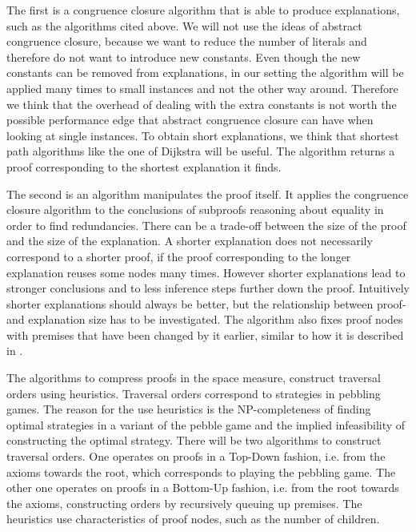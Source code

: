 The first is a congruence closure algorithm that is able to produce explanations, such as the algorithms cited above.
We will not use the ideas of abstract congruence closure, because we want to reduce the number of literals and therefore do not want to introduce new constants.
Even though the new constants can be removed from explanations, in our setting the algorithm will be applied many times to small instances and not the other way around. 
Therefore we think that the overhead of dealing with the extra constants is not worth the possible performance edge \cite{Bachmair2000} that abstract congruence closure can have when looking at single instances.
To obtain short explanations, we think that shortest path algorithms like the one of Dijkstra \cite{Dijkstra1959,Cormen1989} will be useful.
The algorithm returns a proof corresponding to the shortest explanation it finds.

The second is an algorithm manipulates the proof itself.
It applies the congruence closure algorithm to the conclusions of subproofs reasoning about equality in order to find redundancies.
There can be a trade-off between the size of the proof and the size of the explanation.
A shorter explanation does not necessarily correspond to a shorter proof, if the proof corresponding to the longer explanation reuses some nodes many times.
However shorter explanations lead to stronger conclusions and to less inference steps further down the proof.
Intuitively shorter explanations should always be better, but the relationship between proof- and explanation size has to be investigated.
The algorithm also fixes proof nodes with premises that have been changed by it earlier, similar to how it is described in \cite{Boudou2013}.

The algorithms to compress proofs in the space measure, construct traversal orders using heuristics.
Traversal orders correspond to strategies in pebbling games.
The reason for the use heuristics is the NP-completeness of finding optimal strategies in a variant of the pebble game \cite{Sethi1975} and the implied infeasibility of constructing the optimal strategy.
There will be two algorithms to construct traversal orders.
One operates on proofs in a Top-Down fashion, i.e. from the axioms towards the root, which corresponds to playing the pebbling game.
The other one operates on proofs in a Bottom-Up fashion, i.e. from the root towards the axioms, constructing orders by recursively queuing up premises.
The heuristics use characteristics of proof nodes, such as the number of children.

